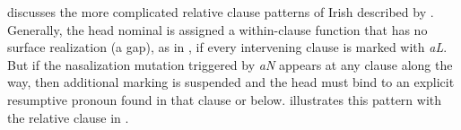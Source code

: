\documentclass[output=paper,hidelinks]{langscibook}
\begin{document}
\ea\label{irish1}  
\z

\citet{Asudeh12} discusses the more complicated relative clause patterns of Irish described by \citet{McCloskey:2002}.   Generally, the head nominal is assigned a within-clause function that has no surface realization (a gap), as in , if every intervening clause is marked with \textit{aL}.  But if the nasalization mutation triggered by \textit{aN} appears at any clause along the way, then additional  marking is suspended and the head must bind to an explicit resumptive pronoun found in that clause or below.  \citet{McCloskey:2002} illustrates this pattern with the relative clause in .  
\end{document}
